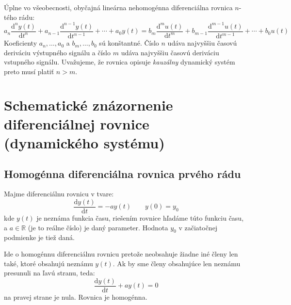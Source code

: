 \documentclass[a4paper, 10pt, ]{article}
\begin{document}
Úplne vo všeobecnosti, obyčajná lineárna nehomogénna diferenciálna rovnica $n$-tého rádu:
\begin{equation}
    a_n \frac{\text{d}^n y(t)}{\text{d}t^n} 
    + a_{n-1} \frac{\text{d}^{n-1} y(t)}{\text{d}t^{n-1}}
    +
    \cdots
    +
    a_0 y(t)
    =
    b_m \frac{\text{d}^m u(t)}{\text{d}t^m} 
    + b_{m-1} \frac{\text{d}^{m-1} u(t)}{\text{d}t^{m-1}}
    +
    \cdots
    +
    b_0 u(t)
\end{equation}
Koeficienty $a_n, \ldots, a_0$ a $b_m, \ldots, b_0$ sú konštantné. Číslo $n$ udáva najvyššiu časovú deriváciu výstupného signálu a číslo $m$ udáva najvyššiu časovú deriváciu vstupného signálu. Uvažujeme, že rovnica opisuje \emph{kauzálny} dynamický systém preto musí platiť $n>m$.






















\section[Schematické znázornenie diferenciálnej rovnice]{Schematické znázornenie diferenciálnej rovnice\\(dynamického systému)}

\subsection{Homogénna diferenciálna rovnica prvého rádu}


Majme diferenciálnu rovnicu v tvare:
\begin{equation} \label{hodrpr01}
    \frac{\text{d}y(t)}{\text{d}t} = - a y(t) \qquad y(0)=y_0
\end{equation}
kde $y(t)$ je neznáma funkcia času, riešením rovnice hľadáme túto funkciu času, a $a\in\mathbb{R}$ (je to reálne číslo) je daný parameter. Hodnota $y_0$ v začiatočnej podmienke je tiež daná.

Ide o homogénnu diferenciálnu rovnicu pretože neobsahuje žiadne iné členy len také, ktoré obsahujú neznámu $y(t)$. Ak by sme členy obsahujúce len neznámu presunuli na ľavú stranu, teda:
\begin{equation}
    \frac{\text{d}y(t)}{\text{d}t} + a y(t) = 0
\end{equation}
na pravej strane je nula. Rovnica je homogénna.
\end{document}
